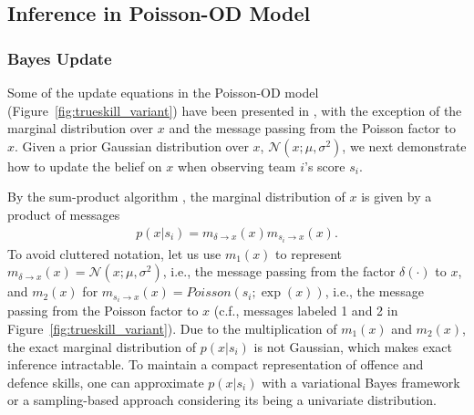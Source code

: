 %

\subsection{Inference in Poisson-OD Model}
\label{sec:PoissonInference}

\subsubsection{Bayes Update}
Some of the update equations in the Poisson-OD model
(Figure~\ref{fig:trueskill_variant}) have been presented in
\cite{herbrich06569}, with the exception of the marginal distribution
over $x$ and the message passing from the Poisson factor to $x$. Given
a prior Gaussian distribution over $x$, $\mathcal{N}(x;\mu,
\sigma^2)$, we next
demonstrate how to update the belief on $x$ when observing
team $i$'s score $s_i$.

By the sum-product algorithm \cite{kschischang01498}, the
marginal distribution of $x$ is given by a product of messages
\begin{align}\label{eq:marginal}
    p(x|s_i) = m_{\delta \rightarrow x}(x) m_{s_i \rightarrow x}(x).
\end{align}
\unindent To avoid cluttered notation, let us use $m_1(x)$ to represent
$m_{\delta \rightarrow x}(x) = \mathcal{N}(x;\mu,\sigma^2)$, i.e., the message
passing from the factor $\delta(\cdot)$ to $x$, and $m_2(x)$ for
$m_{s_i\rightarrow x}(x) = Poisson(s_i;\exp(x))$, i.e.,
the message passing from the Poisson
factor to $x$ (c.f., messages labeled 1 and 2 in
Figure~\ref{fig:trueskill_variant}). Due to the multiplication of
$m_{1}(x)$ and $m_{2}(x)$, the exact marginal distribution of
$p(x|s_i)$ is not Gaussian, which makes exact inference
intractable. To maintain a compact representation of offence and
defence skills, one can approximate $p(x|s_i)$ with a variational
Bayes framework or a sampling-based approach considering its being a univariate distribution.

